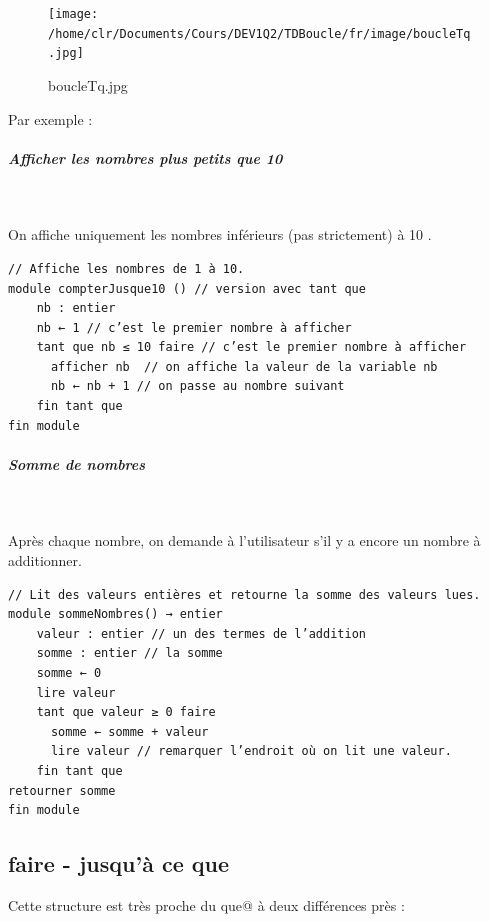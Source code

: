 \documentclass[11pt,a4paper]{article}
\begin{document}
            \par
        \begin{figure}[hbt]
				    \begin{center}
					\texttt{[image: /home/clr/Documents/Cours/DEV1Q2/TDBoucle/fr/image/boucleTq.jpg]}
						\end{center}
                
                    \caption[boucleTq.jpg]{boucleTq.jpg}
                \end{figure}
                    
            \par
        Par exemple : 
            \par
        
			
		\subparagraph{Afficher les nombres plus petits que 10} 
		
					\textcolor{white}{.} \par
				On affiche uniquement les nombres inf\'erieurs (pas strictement) \`a 10 .
            \par
        \begin{verbatim}
// Affiche les nombres de 1 à 10.
module compterJusque10 () // version avec tant que
    nb : entier
    nb ← 1 // c’est le premier nombre à afficher
    tant que nb ≤ 10 faire // c’est le premier nombre à afficher
      afficher nb  // on affiche la valeur de la variable nb
      nb ← nb + 1 // on passe au nombre suivant
    fin tant que
fin module
      \end{verbatim}
			
		\subparagraph{Somme de nombres} 
		
					\textcolor{white}{.} \par
				 Apr\`es chaque nombre, on demande \`a l'utilisateur s'il y a encore un nombre \`a additionner.
            \par
        \begin{verbatim}
// Lit des valeurs entières et retourne la somme des valeurs lues.
module sommeNombres() → entier
    valeur : entier // un des termes de l’addition
    somme : entier // la somme
    somme ← 0
    lire valeur
    tant que valeur ≥ 0 faire
      somme ← somme + valeur
      lire valeur // remarquer l’endroit où on lit une valeur.
    fin tant que
retourner somme
fin module
      \end{verbatim}\subsection{faire - jusqu'\`a ce que}
        Cette structure est tr\`es proche du \guillemotleft  \verb@tant que@ \guillemotright  \`a deux diff\'erences pr\`es :
        
\end{document}
